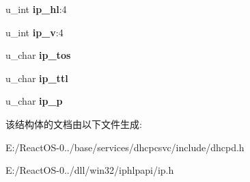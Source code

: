 \begin{DoxyCompactItemize}
\mbox{\label{structip_ae1047e49b3843ff180171130296491a3}} 
u\+\_\+int {\bfseries ip\+\_\+hl}\+:4
\item 
\mbox{\label{structip_a61fe163498c1e39812a62032070a828f}} 
u\+\_\+int {\bfseries ip\+\_\+v}\+:4
\item 
\mbox{\label{structip_a6bb0ce0b741d5362c1ffb59de45c002f}} 
u\+\_\+char {\bfseries ip\+\_\+tos}
\item 
\mbox{\label{structip_af6da26caa84ccb1a03aaa1c4b908eb6c}} 
u\+\_\+char {\bfseries ip\+\_\+ttl}
\item 
\mbox{\label{structip_a13e417b652ed826ff0c5cbdcddbfbfa1}} 
u\+\_\+char {\bfseries ip\+\_\+p}
\end{DoxyCompactItemize}


该结构体的文档由以下文件生成\+:\begin{DoxyCompactItemize}
\item 
E\+:/\+React\+O\+S-\/0../base/services/dhcpcsvc/include/dhcpd.\+h\item 
E\+:/\+React\+O\+S-\/0../dll/win32/iphlpapi/ip.\+h\end{DoxyCompactItemize}
